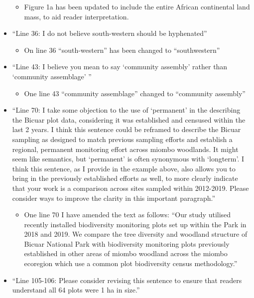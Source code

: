 \documentclass[a4paper]{letter}
\begin{document}
\begin{letter}{}
\begin{itemize}
		\begin{itemize}
			\item{Figure 1a has been updated to include the entire African continental land mass, to aid reader interpretation.}
		\end{itemize}
	\item{``Line 36: I do not believe south-western should be hyphenated''}
		\begin{itemize}
			\item{On line 36 ``south-western'' has been changed to ``southwestern''}
		\end{itemize}
	\item{``Line 43: I believe you mean to say `community assembly' rather than `community assemblage' ''}
		\begin{itemize}
			\item{One line 43 ``community assemblage'' changed to ``community assembly''}
		\end{itemize}
	\item{``Line 70: I take some objection to the use of `permanent' in the describing the Bicuar plot data, considering it was established and censused within the last 2 years. I think this sentence could be reframed to describe the Bicuar sampling as designed to match previous sampling efforts and establish a regional, permanent monitoring effort across miombo woodlands. It might seem like semantics, but `permanent' is often synonymous with `longterm'. I think this sentence, as I provide in the example above, also allows you to bring in the previously established efforts as well, to more clearly indicate that your work is a comparison across sites sampled within 2012-2019. Please consider ways to improve the clarity in this important paragraph.''}
		\begin{itemize}
			\item{One line 70 I have amended the text as follows: ``Our study utilised recently installed biodiversity monitoring plots set up within the Park in 2018 and 2019. We compare the tree diversity and woodland structure of Bicuar National Park with biodiversity monitoring plots previously established in other areas of miombo woodland across the miombo ecoregion which use a common plot biodiversity census methodology.''}
		\end{itemize}
	\item{``Line 105-106: Please consider revising this sentence to ensure that readers understand all 64 plots were 1 ha in size.''}
		\begin{itemize}

\end{itemize}
\end{itemize}
\end{letter}
\end{document}
